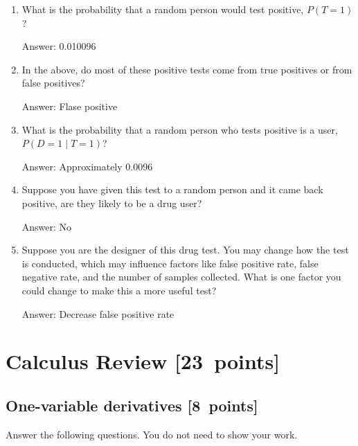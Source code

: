 \documentclass{article}
\newcommand{\blu}[1]{{\textcolor{blu}{#1}}}
\newenvironment{answer}{\par\begingroup\color{gre}Answer: }{\endgroup}
\let\ask\blu
\newcommand\pts[1]{\textcolor{pointscolour}{[#1~points]}}
\begin{document}
  \begin{enumerate}
  \item What is the probability that a random person would test positive, $P(T=1)$?
  \begin{answer}
    0.010096
  \end{answer}
  \item In the above, do most of these positive tests come from true positives or from false positives?
  \begin{answer}
    Flase positive
  \end{answer}
  \item What is the probability that a random person who tests positive is a user, $P(D=1 \mid T=1)$?
  \begin{answer}
    Approximately 0.0096
  \end{answer}
  \item Suppose you have given this test to a random person and it came back positive, are they likely to be a drug user?
  \begin{answer}
    No
  \end{answer}
  \item Suppose you are the designer of this drug test. You may change how the test is conducted, which may influence factors like false positive rate, false negative rate, and the number of samples collected. What is one factor you could change to make this a more useful test?
  \begin{answer}
    Decrease false positive rate
  \end{answer}
  \end{enumerate}


  \clearpage
  \section{Calculus Review \pts{23}}



  \subsection{One-variable derivatives \pts{8}}
  \label{sub.one.var}

  \ask{Answer the following questions.} You do not need to show your work.
\end{document}

